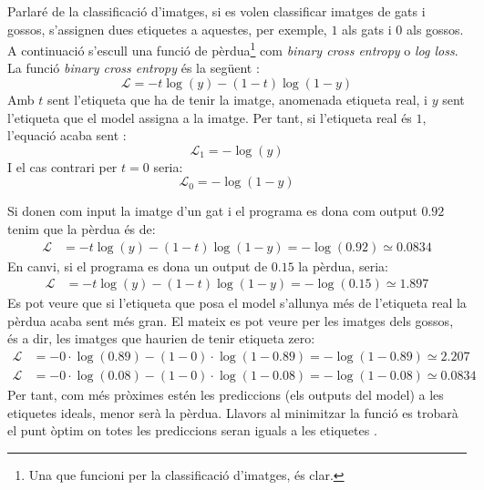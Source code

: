 Parlaré de la classificació d'imatges, si es volen classificar imatges de gats i gossos, s'assignen dues etiquetes a aquestes, per exemple, $1$ als gats i $0$ als gossos. A continuació s'escull una funció de pèrdua\footnote{Una que funcioni per la classificació d'imatges, és clar.} com \textit{binary cross entropy} o \textit{log loss}. La funció \textit{binary cross entropy} és la següent \cite{crossentropy}:
\begin{equation}
	\mathcal{L} = - t\log(y) - (1 - t)\log(1 - y) 
	\label{eq:BCE}
\end{equation}
Amb $t$ sent l'etiqueta que ha de tenir la imatge, anomenada etiqueta real, i $y$ sent l'etiqueta que el model assigna a la imatge. Per tant, si l'etiqueta real és $1$, l'equació acaba sent \cite{crossentropy}:
$$
\mathcal{L}_1 = - \log(y)
$$
I el cas contrari per $t = 0$ seria:
$$
\mathcal{L}_0 = - \log(1 - y)
$$

Si donen com input la imatge d'un gat i el programa es dona com output $0.92$ tenim que la pèrdua és de:
\begin{align*}
	\mathcal{L} &= - t\log(y) - (1 - t)\log(1 - y) = - \log(0.92) \simeq 0.0834
\end{align*}
En canvi, si el programa es dona un output de $0.15$ la pèrdua, seria:
\begin{align*}
	\mathcal{L} &= - t\log(y) - (1 - t)\log(1 - y) = - \log(0.15) \simeq 1.897
\end{align*}
Es pot veure que si l'etiqueta que posa el model s'allunya més de l'etiqueta real la pèrdua acaba sent més gran. El mateix es pot veure per les imatges dels gossos, és a dir, les imatges que haurien de tenir etiqueta zero:
\begin{align*}
	\mathcal{L} &= - 0\cdot\log(0.89) - (1 - 0)\cdot\log(1 - 0.89) = - \log(1- 0.89) \simeq 2.207 \\
	\mathcal{L} &= - 0\cdot\log(0.08) - (1 - 0)\cdot\log(1 - 0.08) = - \log(1- 0.08)\simeq 0.0834
\end{align*}
Per tant, com més pròximes estén les prediccions (els outputs del model) a les etiquetes ideals, menor serà la pèrdua. Llavors al minimitzar la funció es trobarà el punt òptim on totes les prediccions seran iguals a les etiquetes \cite{DL:minmax}.

